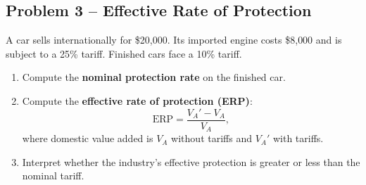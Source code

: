 \documentclass[12pt]{article}
\begin{document}
\subsection*{Problem 3 – Effective Rate of Protection}

A car sells internationally for \$20{,}000.  
Its imported engine costs \$8{,}000 and is subject to a 25\% tariff.  
Finished cars face a 10\% tariff.

\begin{enumerate}[label=(\arabic*)]
\item Compute the \textbf{nominal protection rate} on the finished car.
\item Compute the \textbf{effective rate of protection (ERP)}:
\[
\text{ERP} = \frac{V_A' - V_A}{V_A},
\]
where domestic value added is \(V_A\) without tariffs and \(V_A'\) with tariffs.
\item Interpret whether the industry’s effective protection is greater or less than the nominal tariff.
\end{enumerate}
\end{document}
